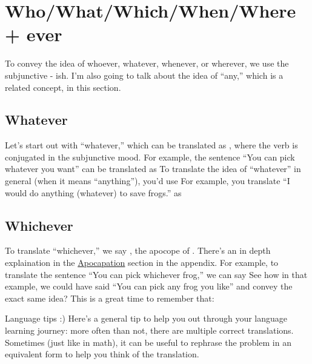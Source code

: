 \section{Who/What/Which/When/Where + ever}

To convey the idea of whoever, whatever, whenever, or wherever, we use the subjunctive - ish. I'm also going to talk about the idea of ``any,'' which is a related concept, in this section. \\

\subsection{Whatever}
Let's start out with ``whatever,'' which can be translated as , where the verb is conjugated in the subjunctive mood. For example, the sentence ``You can pick whatever you want'' can be translated as  To translate the idea of ``whatever'' in general (when it means ``anything''), you'd use  For example, you translate ``I would do anything (whatever) to save frogs.'' as 

\subsection{Whichever}
\label{subsec:cualquier}
To translate ``whichever,'' we say , the apocope of . There's an in depth explaination in the \hyperref[sec:apo]{Apocapation} section in the appendix. For example, to translate the sentence ``You can pick whichever frog,'' we can say  See how in that example, we could have said ``You can pick any frog you like'' and convey the exact same idea? This is a great time to remember that:

\begin{conf}{Language tips :)}
	Here's a general tip to help you out through your language learning journey: more often than not, there are multiple correct translations. Sometimes (just like in math), it can be useful to rephrase the problem in an equivalent form to help you think of the translation.  
\end{conf}

